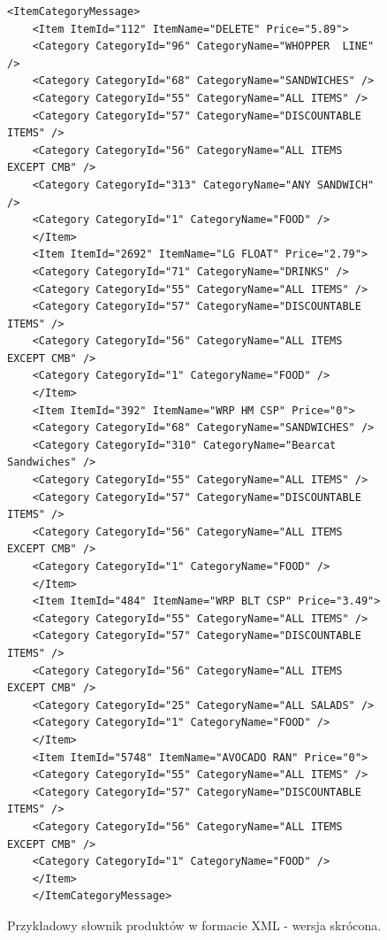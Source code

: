 \documentclass[a4paper]{book}
\begin{document}
\begin{figure}
	\begin{lstlisting}[frame=single, breaklines=true]
	<ItemCategoryMessage>
	<Item ItemId="112" ItemName="DELETE" Price="5.89">
	<Category CategoryId="96" CategoryName="WHOPPER  LINE" />
	<Category CategoryId="68" CategoryName="SANDWICHES" />
	<Category CategoryId="55" CategoryName="ALL ITEMS" />
	<Category CategoryId="57" CategoryName="DISCOUNTABLE ITEMS" />
	<Category CategoryId="56" CategoryName="ALL ITEMS EXCEPT CMB" />
	<Category CategoryId="313" CategoryName="ANY SANDWICH" />
	<Category CategoryId="1" CategoryName="FOOD" />
	</Item>
	<Item ItemId="2692" ItemName="LG FLOAT" Price="2.79">
	<Category CategoryId="71" CategoryName="DRINKS" />
	<Category CategoryId="55" CategoryName="ALL ITEMS" />
	<Category CategoryId="57" CategoryName="DISCOUNTABLE ITEMS" />
	<Category CategoryId="56" CategoryName="ALL ITEMS EXCEPT CMB" />
	<Category CategoryId="1" CategoryName="FOOD" />
	</Item>
	<Item ItemId="392" ItemName="WRP HM CSP" Price="0">
	<Category CategoryId="68" CategoryName="SANDWICHES" />
	<Category CategoryId="310" CategoryName="Bearcat Sandwiches" />
	<Category CategoryId="55" CategoryName="ALL ITEMS" />
	<Category CategoryId="57" CategoryName="DISCOUNTABLE ITEMS" />
	<Category CategoryId="56" CategoryName="ALL ITEMS EXCEPT CMB" />
	<Category CategoryId="1" CategoryName="FOOD" />
	</Item>
	<Item ItemId="484" ItemName="WRP BLT CSP" Price="3.49">
	<Category CategoryId="55" CategoryName="ALL ITEMS" />
	<Category CategoryId="57" CategoryName="DISCOUNTABLE ITEMS" />
	<Category CategoryId="56" CategoryName="ALL ITEMS EXCEPT CMB" />
	<Category CategoryId="25" CategoryName="ALL SALADS" />
	<Category CategoryId="1" CategoryName="FOOD" />
	</Item>
	<Item ItemId="5748" ItemName="AVOCADO RAN" Price="0">
	<Category CategoryId="55" CategoryName="ALL ITEMS" />
	<Category CategoryId="57" CategoryName="DISCOUNTABLE ITEMS" />
	<Category CategoryId="56" CategoryName="ALL ITEMS EXCEPT CMB" />
	<Category CategoryId="1" CategoryName="FOOD" />
	</Item>
	</ItemCategoryMessage>
	\end{lstlisting}
	\caption{Przykładowy słownik produktów w formacie XML - wersja skrócona.}
	\label{lst:przykladowySlownikProduktow}
\end{figure}
\end{document}
